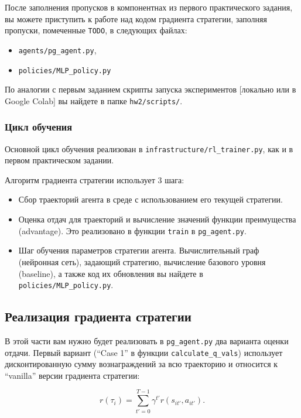 \documentclass[12pt, oneside]{article}
\begin{document}
После заполнения пропусков в компонентнах из первого практического задания, вы можете приступить к работе над кодом градиента стратегии, заполняя пропуски, помеченные \verb|TODO|, в следующих файлах:

\begin{itemize}
    \item \verb|agents/pg_agent.py|,
    \item \verb|policies/MLP_policy.py|
\end{itemize}

По аналогии с первым заданием скрипты запуска экспериментов [локально или в Google Colab] вы найдете в папке \verb|hw2/scripts/|.

\subsubsection{Цикл обучения}

Основной цикл обучения реализован в \verb|infrastructure/rl_trainer.py|, как и в первом практическом задании.

Алгоритм градиента стратегии использует 3 шага:

\begin{itemize}
    \item Сбор траекторий агента в среде с использованием его текущей стратегии.
    \item Оценка отдач для траекторий и вычисление значений функции преимущества (advantage). Это реализовано в функции \verb|train| в \verb|pg_agent.py|.
    \item Шаг обучения параметров стратегии агента. Вычислительный граф (нейронная сеть), задающий стратегию, вычисление базового уровня (baseline), а также код их обновления вы найдете в \verb|policies/MLP_policy.py|.
\end{itemize}

\subsection{Реализация градиента стратегии}

В этой части вам нужно будет реализовать в \verb|pg_agent.py| два варианта оценки отдачи. Первый вариант (``Case 1'' в функции \verb|calculate_q_vals|) использует дисконтированную сумму вознаграждений за всю траекторию и относится к ``vanilla'' версии градиента стратегии:

\begin{equation}
    r(\tau_i) = \sum_{t' = 0}^{T - 1} {\gamma^{t'} r(s_{it'}, a_{it'})}.
\end{equation}
\end{document}
